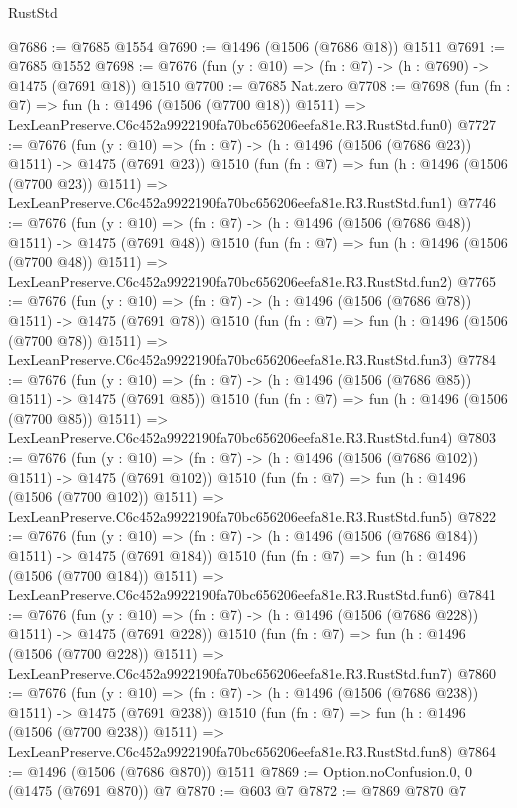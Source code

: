\begin{lexlean}{RustStd}
\begin{coremodule}
@7686 := @7685 @1554
@7690 := @1496 (@1506 (@7686 @18)) @1511
@7691 := @7685 @1552
@7698 := @7676 (fun (y : @10) => (fn : @7) -> (h : @7690) -> @1475 (@7691 @18)) @1510
@7700 := @7685 Nat.zero
@7708 := @7698
    (fun (fn : @7) =>
    fun (h : @1496 (@1506 (@7700 @18)) @1511) =>
    LexLeanPreserve.C6c452a9922190fa70bc656206eefa81e.R3.RustStd.fun0)
@7727 := @7676
    (fun (y : @10) => (fn : @7) -> (h : @1496 (@1506 (@7686 @23)) @1511) -> @1475 (@7691 @23))
    @1510
    (fun (fn : @7) =>
    fun (h : @1496 (@1506 (@7700 @23)) @1511) =>
    LexLeanPreserve.C6c452a9922190fa70bc656206eefa81e.R3.RustStd.fun1)
@7746 := @7676
    (fun (y : @10) => (fn : @7) -> (h : @1496 (@1506 (@7686 @48)) @1511) -> @1475 (@7691 @48))
    @1510
    (fun (fn : @7) =>
    fun (h : @1496 (@1506 (@7700 @48)) @1511) =>
    LexLeanPreserve.C6c452a9922190fa70bc656206eefa81e.R3.RustStd.fun2)
@7765 := @7676
    (fun (y : @10) => (fn : @7) -> (h : @1496 (@1506 (@7686 @78)) @1511) -> @1475 (@7691 @78))
    @1510
    (fun (fn : @7) =>
    fun (h : @1496 (@1506 (@7700 @78)) @1511) =>
    LexLeanPreserve.C6c452a9922190fa70bc656206eefa81e.R3.RustStd.fun3)
@7784 := @7676
    (fun (y : @10) => (fn : @7) -> (h : @1496 (@1506 (@7686 @85)) @1511) -> @1475 (@7691 @85))
    @1510
    (fun (fn : @7) =>
    fun (h : @1496 (@1506 (@7700 @85)) @1511) =>
    LexLeanPreserve.C6c452a9922190fa70bc656206eefa81e.R3.RustStd.fun4)
@7803 := @7676
    (fun (y : @10) => (fn : @7) -> (h : @1496 (@1506 (@7686 @102)) @1511) -> @1475 (@7691 @102))
    @1510
    (fun (fn : @7) =>
    fun (h : @1496 (@1506 (@7700 @102)) @1511) =>
    LexLeanPreserve.C6c452a9922190fa70bc656206eefa81e.R3.RustStd.fun5)
@7822 := @7676
    (fun (y : @10) => (fn : @7) -> (h : @1496 (@1506 (@7686 @184)) @1511) -> @1475 (@7691 @184))
    @1510
    (fun (fn : @7) =>
    fun (h : @1496 (@1506 (@7700 @184)) @1511) =>
    LexLeanPreserve.C6c452a9922190fa70bc656206eefa81e.R3.RustStd.fun6)
@7841 := @7676
    (fun (y : @10) => (fn : @7) -> (h : @1496 (@1506 (@7686 @228)) @1511) -> @1475 (@7691 @228))
    @1510
    (fun (fn : @7) =>
    fun (h : @1496 (@1506 (@7700 @228)) @1511) =>
    LexLeanPreserve.C6c452a9922190fa70bc656206eefa81e.R3.RustStd.fun7)
@7860 := @7676
    (fun (y : @10) => (fn : @7) -> (h : @1496 (@1506 (@7686 @238)) @1511) -> @1475 (@7691 @238))
    @1510
    (fun (fn : @7) =>
    fun (h : @1496 (@1506 (@7700 @238)) @1511) =>
    LexLeanPreserve.C6c452a9922190fa70bc656206eefa81e.R3.RustStd.fun8)
@7864 := @1496 (@1506 (@7686 @870)) @1511
@7869 := Option.noConfusion.{0, 0} (@1475 (@7691 @870)) @7
@7870 := @603 @7
@7872 := @7869 @7870 @7

\end{coremodule}
\end{lexlean}
